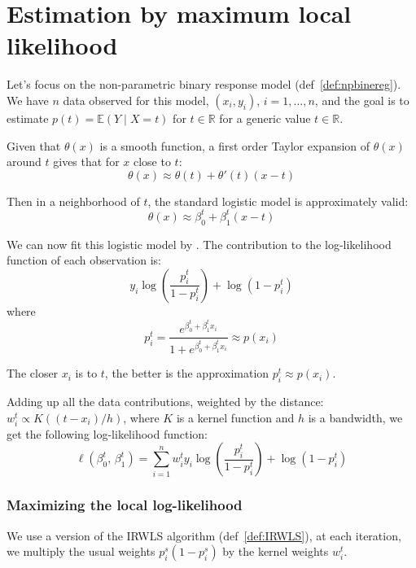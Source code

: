 \pagebreak
{}%
\section{Estimation by maximum local likelihood}

Let's focus on the non-parametric binary response model (def~\ref{def:npbinereg}).
We have $n$ data observed for this model, $(x_i, y_i)$, $i = 1, \ldots, n$,
and the goal is to estimate $p(t) = \mathds{E}(Y \mid X = t)$ for $t \in \mathbb{R}$
for a generic value $t \in \mathds{R}$.

Given that $\theta(x)$ is a smooth function, a first order
Taylor expansion of $\theta(x)$ around $t$ gives that for $x$ close to $t$:
\begin{equation*}
    \theta(x) \approx \theta(t) + \theta'(t) (x - t)
\end{equation*}

Then in a neighborhood of $t$, the standard logistic model is approximately
valid:
\begin{equation*}
    \theta(x) \approx \beta_0^t + \beta_1^t (x - t)
\end{equation*}

We can now fit this logistic model by .
The contribution to the log-likelihood function of each observation is:
\begin{equation*}
    y_i\log\left(
        \frac{p_i^t}{1 - p_i^t}
    \right) + \log\left(1 - p_i^t\right)
\end{equation*}
where
\begin{equation*}
    p_i^t = \frac{e^{\beta_0^t + \beta_1^t x_i }}{1 + e^{\beta_0^t + \beta_1^t x_i }}
    \approx p(x_i)
\end{equation*}

The closer $x_i$ is to $t$, the better is the approximation $p_i^t \approx p(x_i)$.

Adding up all the data contributions, weighted by the distance:
$w_i^t \propto K((t - x_i)/h)$, where $K$ is a kernel function and $h$ is a bandwidth,
we get the following log-likelihood function:
\begin{equation*}
    \ell(\beta_0^t,\, \beta_1^t) = \sum_{i = 1}^n w_i^t y_i\log\left(
        \frac{p_i^t}{1 - p_i^t}
    \right) + \log\left(1 - p_i^t\right)
\end{equation*}

\subsubsection{Maximizing the local log-likelihood}
We use a  version of the IRWLS algorithm (def~\ref{def:IRWLS}),
at each iteration, we multiply the usual weights $p_i^s(1 - p_i^s)$ by the
kernel weights $w_i^t$.


